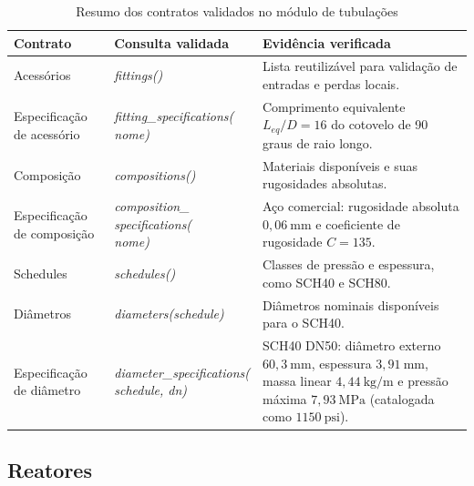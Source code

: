 \begin{table}[H]
    \centering
    \caption{Resumo dos contratos validados no módulo de tubulações}
    \label{tab:contratos-validacao-tubulacoes}
    \small
    \begin{tabular}{p{0.25\textwidth}p{0.28\textwidth}p{0.31\textwidth}}
        \hline
        \textbf{Contrato} & \textbf{Consulta validada} & \textbf{Evidência verificada} \\
        \hline
        Acessórios & \textit{fittings()} & Lista reutilizável para validação de entradas e perdas locais. \\
        Especificação de acessório & \parbox[t]{\linewidth}{\centering\textit{fitting\_specifications(}\newline\textit{nome)}} & \parbox[t]{\linewidth}{\raggedright Comprimento equivalente $L_{eq}/D=16$ do cotovelo de 90 graus de raio longo.} \\
        Composição & \textit{compositions()} & Materiais disponíveis e suas rugosidades absolutas. \\
        Especificação de composição & \parbox[t]{\linewidth}{\centering\textit{composition\_}\newline\textit{specifications(}\newline\textit{nome)}} & Aço comercial: rugosidade absoluta $0,06\ \mathrm{mm}$ e coeficiente de rugosidade $C=135$. \\
        Schedules & \textit{schedules()} & Classes de pressão e espessura, como SCH40 e SCH80. \\
        Diâmetros & \textit{diameters(schedule)} & Diâmetros nominais disponíveis para o SCH40. \\
        Especificação de diâmetro & \parbox[t]{\linewidth}{\centering\textit{diameter\_specifications(}\newline\textit{schedule, dn)}} & \parbox[t]{\linewidth}{\raggedright SCH40 DN50: diâmetro externo $60,3\ \mathrm{mm}$, espessura $3,91\ \mathrm{mm}$, massa linear $4,44\ \mathrm{kg/m}$ e pressão máxima $7,93\ \mathrm{MPa}$ (catalogada como $1150\ \mathrm{psi}$).} \\
        \hline
    \end{tabular}
\end{table}



\subsection{Reatores}

